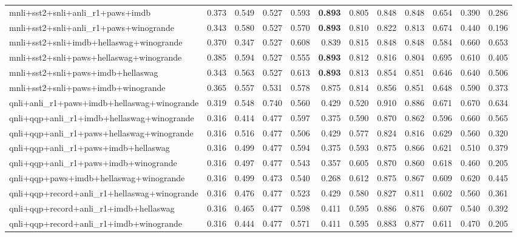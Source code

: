 \begin{table}[t]
\begin{tabular}{lrrrrrrrrrrr}
    mnli+sst2+snli+anli\_r1+paws+imdb & 0.373 & 0.549 & 0.527 & 0.593 & \textbf{0.893} & 0.805 & 0.848 & 0.848 & 0.654 & 0.390 & 0.286 \\
    mnli+sst2+snli+anli\_r1+paws+winogrande & 0.343 & 0.580 & 0.527 & 0.570 & \textbf{0.893} & 0.810 & 0.822 & 0.813 & 0.674 & 0.440 & 0.196 \\
    mnli+sst2+snli+imdb+hellaswag+winogrande & 0.370 & 0.347 & 0.527 & 0.608 & 0.839 & 0.815 & 0.848 & 0.848 & 0.584 & 0.660 & 0.653 \\
    mnli+sst2+snli+paws+hellaswag+winogrande & 0.385 & 0.594 & 0.527 & 0.555 & \textbf{0.893} & 0.812 & 0.816 & 0.804 & 0.695 & 0.610 & 0.405 \\
    mnli+sst2+snli+paws+imdb+hellaswag & 0.343 & 0.563 & 0.527 & 0.613 & \textbf{0.893} & 0.813 & 0.854 & 0.851 & 0.646 & 0.640 & 0.506 \\
    mnli+sst2+snli+paws+imdb+winogrande & 0.365 & 0.557 & 0.531 & 0.578 & 0.875 & 0.814 & 0.856 & 0.851 & 0.648 & 0.590 & 0.373 \\
    qnli+anli\_r1+paws+imdb+hellaswag+winogrande & 0.319 & 0.548 & 0.740 & 0.560 & 0.429 & 0.520 & 0.910 & 0.886 & 0.671 & 0.670 & 0.634 \\
    qnli+qqp+anli\_r1+imdb+hellaswag+winogrande & 0.316 & 0.414 & 0.477 & 0.597 & 0.375 & 0.590 & 0.870 & 0.862 & 0.596 & 0.660 & 0.565 \\
    qnli+qqp+anli\_r1+paws+hellaswag+winogrande & 0.316 & 0.516 & 0.477 & 0.506 & 0.429 & 0.577 & 0.824 & 0.816 & 0.629 & 0.560 & 0.320 \\
    qnli+qqp+anli\_r1+paws+imdb+hellaswag & 0.316 & 0.499 & 0.477 & 0.594 & 0.375 & 0.593 & 0.875 & 0.866 & 0.621 & 0.510 & 0.379 \\
    qnli+qqp+anli\_r1+paws+imdb+winogrande & 0.316 & 0.497 & 0.477 & 0.543 & 0.357 & 0.605 & 0.870 & 0.860 & 0.618 & 0.460 & 0.205 \\
    qnli+qqp+paws+imdb+hellaswag+winogrande & 0.316 & 0.499 & 0.473 & 0.540 & 0.268 & 0.612 & 0.875 & 0.867 & 0.609 & 0.620 & 0.445 \\
    qnli+qqp+record+anli\_r1+hellaswag+winogrande & 0.316 & 0.476 & 0.477 & 0.523 & 0.429 & 0.580 & 0.827 & 0.811 & 0.602 & 0.560 & 0.361 \\
    qnli+qqp+record+anli\_r1+imdb+hellaswag & 0.316 & 0.465 & 0.477 & 0.598 & 0.411 & 0.595 & 0.886 & 0.876 & 0.607 & 0.540 & 0.392 \\
    qnli+qqp+record+anli\_r1+imdb+winogrande & 0.316 & 0.444 & 0.477 & 0.571 & 0.411 & 0.595 & 0.883 & 0.877 & 0.611 & 0.470 & 0.205 \\

\end{tabular}
\end{table}
